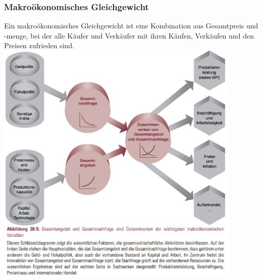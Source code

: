 \documentclass[10pt]{scrartcl}
\begin{document}
\subsubsection{Makroökonomisches Gleichgewicht}
Ein makroökonomisches Gleichgewicht ist eine Kombination aus Gesamtpreis und -menge, bei der alle Käufer und Verkäufer mit ihren Käufen, Verkäufen und den Preisen zufrieden sind. \\
\includegraphics[width=0.88\textwidth]{img/gesamt.jpg}
\end{document}
